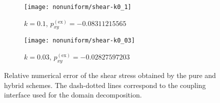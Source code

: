 \documentclass[]{elsarticle} %
\begin{document}
\begin{comment} %
\begin{figure}
   \centering
   \begin{subfigure}[b]{0.5\textwidth}
       \texttt{[image: d3q19-k0\_3]}
       \caption{ (D3Q19)}
       \label{fig:d3q19-k03}
   \end{subfigure}%
   \begin{subfigure}[b]{0.5\textwidth}
       \texttt{[image: d3v96-k0\_3.pdf]}
       \caption{ (D3Q96)}
       \label{fig:d3v96-k03}
   \end{subfigure}\\
   \begin{subfigure}[b]{0.5\textwidth}
       \includegraphics[width=\textwidth]
       {hyb-d3q19-k0_3.pdf}
       \caption{hybrid (DV and D3Q19)}
       \label{fig:hyb:d3q19-k03}
   \end{subfigure}%
   \begin{subfigure}[b]{0.5\textwidth}
       \includegraphics[width=\textwidth]
       {hyb-d3v96-k0_3.pdf}
       \caption{hybrid (DV and D3Q96)}
       \label{fig:hyb:d3v96-k03}
   \end{subfigure}
   \caption{
       Numerical solution of the Couette-flow problem for $k=0.3$ obtained by the proposed hybrid method.
       The matching point is placed  at the  distance $1.2 Kn$ from the  boundary.
       The black lines are the high-accuracy solution for the BGK model.
       The black boxes correspond to the tabulated solutions~\cite{Luo2016}.
   }\label{fig:hybrid03}
\end{figure}
\end{comment}

\begin{figure}
    \centering
    \begin{subfigure}[b]{0.5\textwidth}
        \texttt{[image: nonuniform/shear-k0\_1]}
        \caption{\(k=0.1\), \(p^\mathrm{(ex)}_{xy} = -0.08311215565\)~\cite{Luo2016}}
        \label{fig:accuracy-k01}
    \end{subfigure}%
    \begin{subfigure}[b]{0.5\textwidth}
        \texttt{[image: nonuniform/shear-k0\_03]}
        \caption{\(k=0.03\), \(p^\mathrm{(ex)}_{xy} = -0.02827597203\)~\cite{Luo2016}}
        \label{fig:accuracy-k003}
    \end{subfigure}
    \caption{
        Relative numerical error of the shear stress obtained by the pure and hybrid schemes.
        The dash-dotted lines correspond to the coupling interface used for the domain decomposition.
    }\label{fig:accuracy}
\end{figure}
\end{document}
